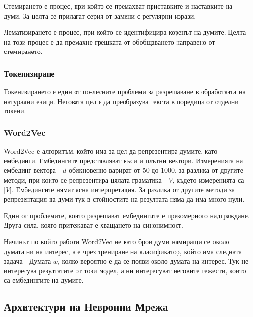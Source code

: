 \documentclass{article}
\newcounter{subsubsubsection}[subsubsection]
\begin{document}

    Стемирането е процес, при който се премахват приставките и наставките на думи. За целта се прилагат серия от замени с
    регулярни изрази. \cite{intro-to-nlp-mit}


    Лематизирането е процес, при който се идентифицира коренът на думите. Целта на този процес е да премахне грешката от
    обобщаването направено от стемирането. \cite{intro-to-nlp-mit}

    \subsubsection{Токенизиране}

    Токенизирането е един от по-лесните проблеми за разрешаване в обработката на натурални езици. Неговата цел е да
    преобразува текста в поредица от отделни токени. \cite{intro-to-nlp-mit}

    \subsubsection{Word2Vec}

    Word2Vec е алгоритъм, който има за цел да репрезентира думите, като ембединги. Ембедингите представляват къси и плътни
    вектори. Измеренията на ембединг вектора - $d$ обикновенно варират от 50 до 1000, за разлика от другите методи, при
    които се репрезентира цялата граматика - $V$, където измеренията са $|V|$. Ембедингите нямат ясна интерпретация. За
    разлика от другите методи за репрезентация на думи тук в стойностите на резултата няма да има много нули.

    Един от проблемите, които разрешават ембедингите е прекомерното надграждане. Друга сила, която притежават е хващането
    на синонимност.

    Начинът по който работи Word2Vec не като брои думи намиращи се около думата ни на интерес, а е чрез трениране на
    класификатор, който има следната задача - Думата $w$, колко вероятно е да се появи около думата на интерес. Тук не
    интересува резултатите от този модел, а ни интересуват неговите тежести, които са ембедингите на думите.
    \cite{intro-to-nlp-mit}

    \subsection{Архитектури на Невронни Мрежа}
\end{document}
